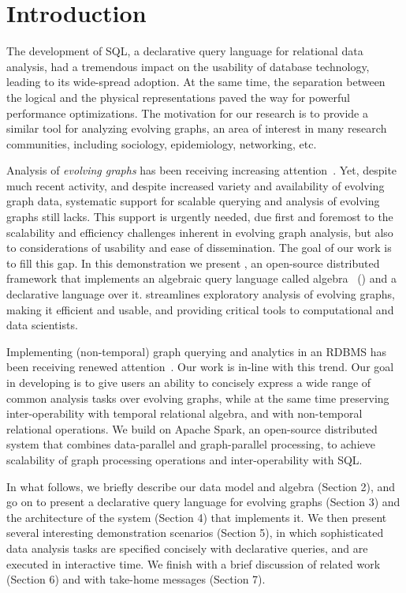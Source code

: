\section{Introduction}
\label{sec:intro}

The development of SQL, a declarative query language for relational
data analysis, had a tremendous impact on the usability of database
technology, leading to its wide-spread adoption. At the same time, the
separation between the logical and the physical representations paved
the way for powerful performance optimizations. The motivation for our
research is to provide a similar tool for analyzing evolving graphs,
an area of interest in many research communities, including sociology,
epidemiology, networking, etc.

Analysis of {\em evolving graphs} has been receiving increasing
attention~\cite{DBLP:journals/csur/AggarwalS14,Miao2015,Ren2011,Semertzidis2015}.
Yet, despite much recent activity, and despite increased variety and
availability of evolving graph data, systematic support for scalable
querying and analysis of evolving graphs still lacks.  This support is
urgently needed, due first and foremost to the scalability and
efficiency challenges inherent in evolving graph analysis, but also to
considerations of usability and ease of dissemination.  The goal of
our work is to fill this gap.  In this demonstration we present
\sys, an open-source distributed framework that implements an
algebraic query language called \tg algebra~\cite{PortalarXiv2016}
(\tga) and a declarative language \ql over it. \sys streamlines
exploratory analysis of evolving graphs, making it efficient and
usable, and providing critical tools to computational and data
scientists.

Implementing (non-temporal) graph querying and analytics in an RDBMS
has been receiving renewed
attention~\cite{DBLP:conf/sigmod/AbergerTOR16,DBLP:conf/sigmod/SunFSKHX15,DBLP:journals/pvldb/Xirogiannopoulos15}.
Our work is in-line with this trend.  Our goal in developing \sys is
to give users an ability to concisely express a wide range of common
analysis tasks over evolving graphs, while at the same time preserving
inter-operability with temporal relational algebra, and with
non-temporal relational operations.  We build on Apache Spark, an
open-source distributed system that combines data-parallel and
graph-parallel processing, to achieve scalability of graph processing
operations and inter-operability with SQL.

In what follows, we briefly describe our data model and algebra
(Section 2), and go on to present a declarative query language for
evolving graphs (Section 3) and the architecture of the \sys system
(Section 4) that implements it. We then present several interesting
demonstration scenarios (Section 5), in which sophisticated data
analysis tasks are specified concisely with declarative \ql queries,
and are executed in interactive time.  We finish with a brief
discussion of related work (Section 6) and with take-home messages
(Section 7).


